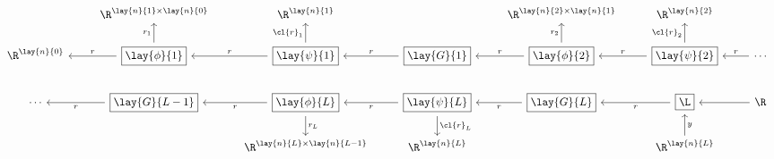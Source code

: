 {\tiny
\begin{equation*}
	\begin{tikzcd}
		{}
		&\R^{\lay{n}{1}\times\lay{n}{0}}
		&\R^{\lay{n}{1}}
		&{}
		&\R^{\lay{n}{2}\times\lay{n}{1}}
		&\R^{\lay{n}{2}}
		\\
		\R^{\lay{n}{0}}
		&\boxed{\lay{\phi}{1}}
		\arrow[u, "r_1"]
		\arrow[l, swap, "r"]
		&\boxed{\lay{\psi}{1}}
		\arrow[u, "\cl{r}_1"]
		\arrow[l, swap, "r"]
		&\boxed{\lay{G}{1}}
		\arrow[l, swap, "r"]
		&\boxed{\lay{\phi}{2}}
		\arrow[u,  "r_2"]
		\arrow[l, swap, "r"]
		&\boxed{\lay{\psi}{2}}
		\arrow[u, "\cl{r}_2"]
		\arrow[l, swap, "r"]
		&\cdots
		\arrow[l, swap, "r"]\\
		\cdots
		&\boxed{\lay{G}{L-1}}
		\arrow[l, "r"]
		&\boxed{\lay{\phi}{L}}
		\arrow[d, "r_L"]
		\arrow[l, "r"]
		&\boxed{\lay{\psi}{L}}
		\arrow[d, "\cl{r}_L"]
		\arrow[l, "r"]
		&\boxed{\lay{G}{L}}
		\arrow[l, "r"]
		&\boxed{\L}
		\arrow[l, "r"]
		&\R
		\arrow[l]
		\\
		{}
		&{}
		&\R^{\lay{n}{L}\times\lay{n}{L-1}}
		&\R^{\lay{n}{L}}
		&{}
		&\R^{\lay{n}{L}}
		\arrow[u, swap, "y"]
		&{}
	\end{tikzcd}
\end{equation*}
}

